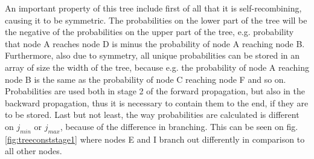 An important property of this tree include first of all that it is self-recombining, causing it to be symmetric. The probabilities on the lower part of the tree will be the negative of the probabilities on the upper part of the tree, e.g. probability that node A reaches node D is minus the probability of node A reaching node B. Furthermore, also due to symmetry, all unique probabilities can be stored in an array of size the width of the tree, because e.g. the probability of node A reaching node B is the same as the probability of node C reaching node F and so on. Probabilities are used both in stage 2 of the forward propagation, but also in the backward propagation, thus it is necessary to contain them to the end, if they are to be stored. Last but not least, the way probabilities are calculated is different on $j_{min}$ or $j_{max}$, because of the difference in branching. This can be seen on fig. \ref{fig:treeconststage1} where nodes E and I branch out differently in comparison to all other nodes. 

